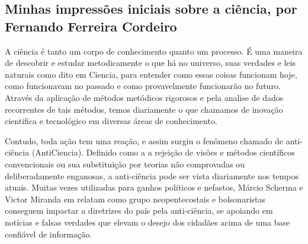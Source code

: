 \subsection{Minhas impressões iniciais sobre a ciência, por Fernando Ferreira Cordeiro}
A ciência é tanto um corpo de conhecimento quanto um processo. É uma maneira de descobrir e estudar metodicamente o que há no universo, suas verdades e leis naturais como dito em \gls{Ciencia}, para entender como essas coisas funcionam hoje, como funcionavam no passado e como provavelmente funcionarão no futuro. Através da aplicação de métodos metódicos rigorosos e pela analise de dados recorrentes de tais métodos, temos diariamente o que chamamos de inovação cientifica e tecnológico em diversas áreas de conhecimento.

Contudo, toda ação tem uma reação, e assim surgiu o fenômeno chamado de anti-ciência (\gls{AntiCiencia}). Definido como a a rejeição de visões e métodos científicos convencionais ou sua substituição por teorias não comprovadas ou deliberadamente enganosas, a anti-ciência pode ser vista diariamente nos tempos atuais. Muitas vezes utilizadas para ganhos políticos e nefastos, Márcio Scherma e Victor Miranda em \citep{scherma_relatos_2020} relatam como grupo neopentecostais e bolsonaristas conseguem impactar a diretrizes do país pela anti-ciência, se apoiando em notícias e falsas verdades que elevam o desejo dos cidadães acima de uma base confiável de informação.

